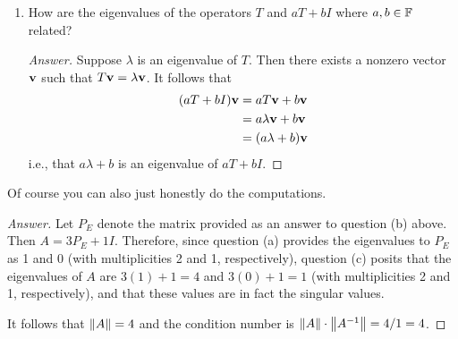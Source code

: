 \documentclass[../psets.tex]{subfiles}
\begin{document}
\begin{enumerate}[label={\textbf{4.\arabic*.}}]
\begin{enumerate}
\begin{proof}[Answer]
            From Problem 5.3.9a, the matrix of this projection is
            \begin{equation*}
                \frac{1}{3}
                \begin{pmatrix}
                    1 & 1 & 1\\
                    1 & 1 & 1\\
                    1 & 1 & 1\\
                \end{pmatrix}
            \end{equation*}
        \end{proof}
        \item How are the eigenvalues of the operators $T$ and $aT+bI$ where $a,b\in\mathbb{F}$ related?
        \begin{proof}[Answer]
            Suppose $\lambda$ is an eigenvalue of $T$. Then there exists a nonzero vector $\mathbf{v}$ such that $T\mathbf{v}=\lambda\mathbf{v}$. It follows that
            \begin{align*}
                (aT+bI)\mathbf{v} &= aT\mathbf{v}+b\mathbf{v}\\
                &= a\lambda\mathbf{v}+b\mathbf{v}\\
                &= (a\lambda+b)\mathbf{v}
            \end{align*}
            i.e., that $a\lambda+b$ is an eigenvalue of $aT+bI$.
        \end{proof}
    \end{enumerate}
    Of course you can also just honestly do the computations.
    \begin{proof}[Answer]
        Let $P_E$ denote the matrix provided as an answer to question (b) above. Then $A=3P_E+1I$. Therefore, since question (a) provides the eigenvalues to $P_E$ as 1 and 0 (with multiplicities 2 and 1, respectively), question (c) posits that the eigenvalues of $A$ are $3(1)+1=4$ and $3(0)+1=1$ (with multiplicities 2 and 1, respectively), and that these values are in fact the singular values.\par
        It follows that $\norm{A}=4$ and the condition number is $\norm{A}\cdot\norm{A^{-1}}=4/1=4$.
    \end{proof}
\end{enumerate}
\end{document}
